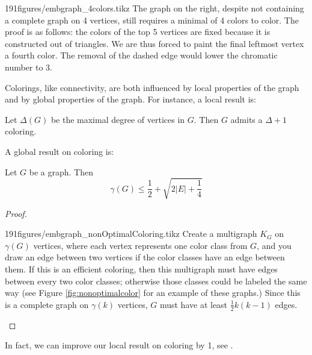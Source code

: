 \begin{examplefigureenv}{191figures/embgraph_4colors.tikz}
  The graph on the right, despite not containing a complete graph on 4 vertices, still requires a minimal of 4 colors to color. The proof is as follows: the colors of the top 5 vertices are fixed because it is constructed out of triangles. We are thus forced to paint the final leftmost vertex a fourth color. The removal of the dashed edge would lower the chromatic number to 3. 
\end{examplefigureenv}
Colorings, like connectivity, are both influenced by local properties of the graph and by global properties of the graph. For instance, a local result is:
\begin{claim}
 Let $\Delta(G)$ be the maximal degree of vertices in $G$. Then $G$ admits a $\Delta+1$ coloring. 
\end{claim}
A global result on coloring is:
\begin{claim}
 Let $G$ be a graph. Then 
 \[\gamma(G)\leq \frac{1}{2}+\sqrt{2|E|+\frac{1}{4}}\]
\end{claim}
\begin{proof}
\begin{paragraphfigureenv}{191figures/embgraph_nonOptimalColoring.tikz}
 Create a multigraph $K_G$ on $\gamma(G)$ vertices, where each vertex represents one color class from $G$, and you draw an edge between two vertices if the color classes have an edge between them. If this is an efficient coloring, then this multigraph must have edges between every two color classes; otherwise those classes could be labeled the same way (see Figure \ref{fig:nonoptimalcolor} for an example of these graphs.) Since this is a complete graph on $\gamma(k)$ vertices, $G$ must have at least $\frac{1}{2}k(k-1)$ edges. 
\end{paragraphfigureenv}
\end{proof}
In fact, we can improve our local result on coloring by 1, see . 

